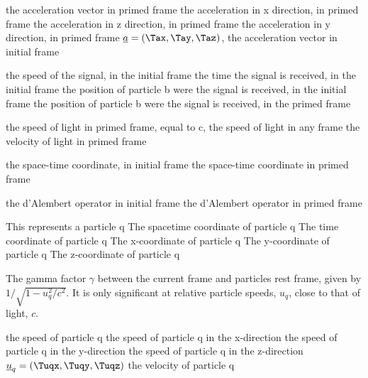 {the acceleration vector in primed frame}
{the acceleration in x direction, in primed frame}
{the acceleration in z direction, in primed frame}
{the acceleration in y direction, in primed frame}
{$\underline{a}=(\Tax,\Tay,\Taz)$, the acceleration vector in initial frame}

{the speed of the signal, in the initial frame}
{the time the signal is received, in the initial frame}
{the position of particle b were the signal is received, in the initial frame}
{the position of particle b were the signal is received, in the primed frame}


{the speed of light in primed frame, equal to c, the speed of light in any frame}
{the velocity of light in primed frame}

{the space-time coordinate, in initial frame}
{the space-time coordinate in primed frame}

\variableterm{\TdAlembert}{\square}
{the d'Alembert operator in initial frame}
{the d'Alembert operator in primed frame}

{This represents a particle q}
{The spacetime coordinate of particle q}
{The time coordinate of particle q}
{The x-coordinate of particle q}
{The y-coordinate of particle q}
{The z-coordinate of particle q}

{The gamma factor $\gamma$ between the current frame and particles rest frame, given by ${1/\sqrt{1-u_q^2/c^2}}$. It is only significant at relative particle speeds, $u_q$, close to that of light, $c$.}

{the speed of particle q}
{the speed of particle q in the x-direction}
{the speed of particle q in the y-direction}
{the speed of particle q in the z-direction}
{$\underline{u}_{q}=(\Tuqx,\Tuqy,\Tuqz)$ the velocity of particle q}

